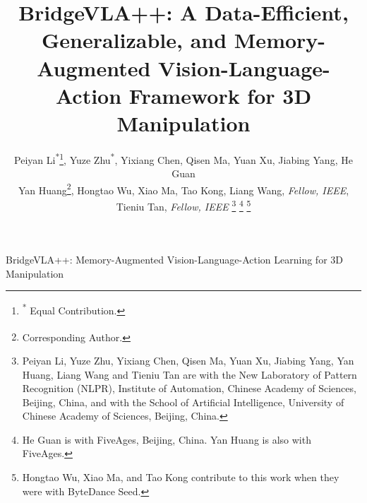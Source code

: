\documentclass[journal]{IEEEtran}
\newcommand{\memmethod}{BridgeVLA++\xspace}
\begin{document}

\title{\memmethod: A Data-Efficient, Generalizable, and Memory-Augmented Vision-Language-Action Framework for 3D Manipulation}
\author{
Peiyan Li\textsuperscript{*}\thanks{\textsuperscript{*} Equal Contribution.}, Yuze Zhu\textsuperscript{*}, Yixiang Chen, Qisen Ma, Yuan Xu, Jiabing Yang, He Guan\\
Yan Huang\textsuperscript{\textdagger}\thanks{\textsuperscript{\textdagger} Corresponding Author.}, Hongtao Wu, Xiao Ma,
Tao Kong, Liang Wang, \textit{Fellow, IEEE}, Tieniu Tan, \textit{Fellow, IEEE}%
\thanks{Peiyan Li, Yuze Zhu, Yixiang Chen, Qisen Ma, Yuan Xu, Jiabing Yang, Yan Huang, Liang Wang and Tieniu Tan are with the New Laboratory of Pattern Recognition (NLPR), Institute of Automation, Chinese Academy of Sciences, Beijing, China, and with the School of Artificial Intelligence, University of Chinese Academy of Sciences, Beijing, China.}%
\thanks{He Guan is with FiveAges, Beijing, China. Yan Huang is also with FiveAges.}%
\thanks{Hongtao Wu, Xiao Ma, and Tao Kong contribute to this work when they were with ByteDance Seed.}}

%
{\memmethod: Memory-Augmented Vision-Language-Action Learning for 3D Manipulation}

\maketitle
\end{document}

